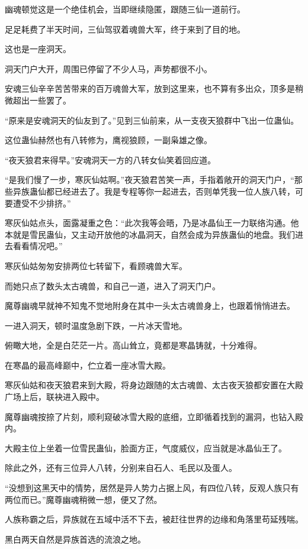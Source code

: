 \begin{this_body}
幽魂顿觉这是一个绝佳机会，当即继续隐匿，跟随三仙一道前行。

足足耗费了半天时间，三仙驾驭着魂兽大军，终于来到了目的地。

这也是一座洞天。

洞天门户大开，周围已停留了不少人马，声势都很不小。

安魂三仙辛辛苦苦带来的百万魂兽大军，放到这里来，也不算有多出众，顶多是稍微超出一些罢了。

“原来是安魂洞天的仙友到了。”见到三仙前来，从一支夜天狼群中飞出一位蛊仙。

这位蛊仙赫然也有八转修为，鹰视狼顾，一副枭雄之像。

“夜天狼君来得早。”安魂洞天一方的八转女仙笑着回应道。

“是我们慢了一步，寒灰仙姑啊。”夜天狼君苦笑一声，手指着敞开的洞天门户，“那些异族蛊仙都已经进去了。我是专程等你一起进去，否则单凭我一位人族八转，可要遭受不少排挤。”

寒灰仙姑点头，面露凝重之色：“此次我等会晤，乃是冰晶仙王一力联络沟通。他本就是雪民蛊仙，又主动开放他的冰晶洞天，自然会成为异族蛊仙的地盘。我们进去看看情况吧。”

寒灰仙姑匆匆安排两位七转留下，看顾魂兽大军。

而她只点了数头太古魂兽，和自己一道，进入了洞天门户。

魔尊幽魂早就神不知鬼不觉地附身在其中一头太古魂兽身上，也跟着悄悄进去。

一进入洞天，顿时温度急剧下跌，一片冰天雪地。

俯瞰大地，全是白茫茫一片。高山耸立，竟都是寒晶铸就，十分难得。

在寒晶的最高峰巅中，伫立着一座冰雪大殿。

寒灰仙姑和夜天狼君来到大殿，将身边跟随的太古魂兽、太古夜天狼都安置在大殿广场上后，联袂进入殿中。

魔尊幽魂按捺了片刻，顺利窥破冰雪大殿的底细，立即循着找到的漏洞，也钻入殿内。

大殿主位上坐着一位雪民蛊仙，脸面方正，气度威仪，应当就是冰晶仙王了。

除此之外，还有三位异人八转，分别来自石人、毛民以及蛋人。

“没想到这黑天中的情势，居然是异人势力占据上风，有四位八转，反观人族只有两位而已。”魔尊幽魂稍微一想，便又了然。

人族称霸之后，异族就在五域中活不下去，被赶往世界的边缘和角落里苟延残喘。

黑白两天自然是异族首选的流浪之地。


\end{this_body}
